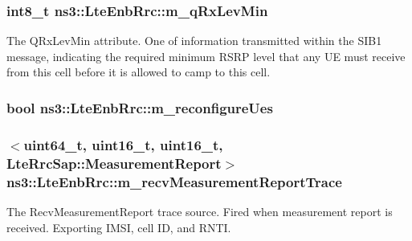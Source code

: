 \subsubsection[{\texorpdfstring{m\+\_\+q\+Rx\+Lev\+Min}{m_qRxLevMin}}]{\setlength{\rightskip}{0pt plus 5cm}int8\+\_\+t ns3\+::\+Lte\+Enb\+Rrc\+::m\+\_\+q\+Rx\+Lev\+Min\hspace{0.3cm}{\ttfamily [private]}}\hypertarget{classns3_1_1LteEnbRrc_a17165cd0183013d03b55fead640067d8}{}\label{classns3_1_1LteEnbRrc_a17165cd0183013d03b55fead640067d8}
The {\ttfamily Q\+Rx\+Lev\+Min} attribute. One of information transmitted within the S\+I\+B1 message, indicating the required minimum R\+S\+RP level that any UE must receive from this cell before it is allowed to camp to this cell. 
\subsubsection[{\texorpdfstring{m\+\_\+reconfigure\+Ues}{m_reconfigureUes}}]{\setlength{\rightskip}{0pt plus 5cm}bool ns3\+::\+Lte\+Enb\+Rrc\+::m\+\_\+reconfigure\+Ues\hspace{0.3cm}{\ttfamily [private]}}\hypertarget{classns3_1_1LteEnbRrc_ae7db42291c9eae0a693615ad5cb94baf}{}\label{classns3_1_1LteEnbRrc_ae7db42291c9eae0a693615ad5cb94baf}
\subsubsection[{\texorpdfstring{m\+\_\+recv\+Measurement\+Report\+Trace}{m_recvMeasurementReportTrace}}]{$<$uint64\+\_\+t, uint16\+\_\+t, uint16\+\_\+t, {\bf Lte\+Rrc\+Sap\+::\+Measurement\+Report}$>$ ns3\+::\+Lte\+Enb\+Rrc\+::m\+\_\+recv\+Measurement\+Report\+Trace\hspace{0.3cm}{\ttfamily [private]}}\hypertarget{classns3_1_1LteEnbRrc_a88f4bfb8909dde7fd5bcd6af575139ba}{}\label{classns3_1_1LteEnbRrc_a88f4bfb8909dde7fd5bcd6af575139ba}
The {\ttfamily Recv\+Measurement\+Report} trace source. Fired when measurement report is received. Exporting I\+M\+SI, cell ID, and R\+N\+TI. 
